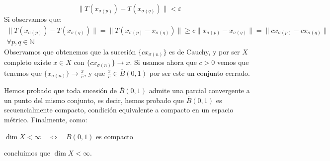 \documentclass[12pt]{article}
\begin{document}
\begin{ejercicio}
\begin{description}
                \begin{equation*}
                    \|T(x_{\sigma(p)}) - T(x_{\sigma(q)}) \| < \varepsilon
                \end{equation*}
                Si observamos que:
                \begin{multline*}
                    \|T(x_{\sigma(p)})-T(x_{\sigma(q)})\| = \|T(x_{\sigma(p)}-x_{\sigma(q)})\| \geq c\|x_{\sigma(p)} - x_{\sigma(q)}\| = \|cx_{\sigma(p)}-cx_{\sigma(q)}\| \\ \forall p,q\in \mathbb{N}
                \end{multline*}
                Observamos que obtenemos que la sucesión $\{cx_{\sigma(n)}\}$ es de Cauchy, y por ser $X$ completo existe $x\in X$ con $\{cx_{\sigma(n)}\}\to x$. Si usamos ahora que $c>0$ vemos que tenemos que $\{x_{\sigma(n)}\}\to \frac{x}{c}$, y que $\frac{x}{c}\in \overline{B}(0,1)$ por ser este un conjunto cerrado.

                Hemos probado que toda sucesión de $\overline{B}(0,1)$ admite una parcial convergente a un punto del mismo conjunto, es decir, hemos probado que $\overline{B}(0,1)$ es secuencialmente compacto, condición equivalente a compacto en un espacio métrico. Finalmente, como:
                \begin{center}
                    $\dim X < \infty \quad\Longleftrightarrow\quad \overline{B}(0,1)$ es compacto
                \end{center}
                concluimos que $\dim X < \infty$.
        \end{description}
    \end{ejercicio}
\end{document}
